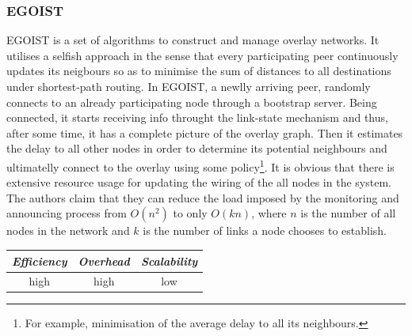 \subsubsection{EGOIST}
EGOIST \cite{egoist_2008} is a set of algorithms to construct and manage overlay
networks. It utilises a selfish approach in the sense that every participating
peer continuously updates its neigbours so as to minimise the sum of distances
to all destinations under shortest-path routing. In EGOIST, a newlly arriving
peer, randomly connects to an already participating node through a bootstrap
server. Being connected, it starts receiving info throught the link-state
mechanism and thus, after some time, it has a complete picture of the overlay
graph. Then it estimates the delay to all other nodes in order to determine its
potential neighbours and ultimatelly connect to the overlay using some
policy\footnote{For example, minimisation of the average delay to all its
neighbours.}. It is obvious that there is extensive resource usage for updating
the wiring of the all nodes in the system. The authors claim that they can
reduce the load imposed by the monitoring and announcing process from $O(n^2)$
to only $O(kn)$, where $n$ is the number of all nodes in the network and $k$ is
the number of links a node chooses to establish.

\begin{center}
\begin{tabular}{ccc}
\emph{Efficiency} & \emph{Overhead} & \emph{Scalability} \\
\hline
high &
high &
low
\end{tabular}
\end{center}

